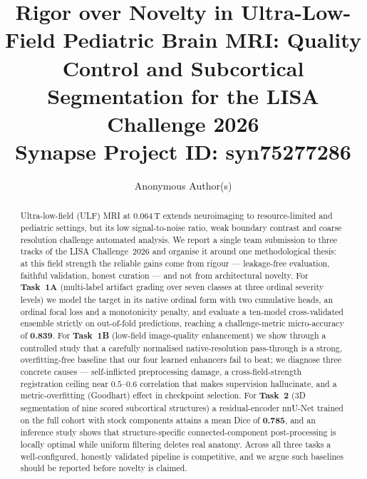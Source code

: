 \documentclass[runningheads]{llncs}
\begin{document}
\title{Rigor over Novelty in Ultra-Low-Field Pediatric Brain MRI:
Quality Control and Subcortical Segmentation for the LISA Challenge 2026\\
\large Synapse Project ID: syn75277286}

\author{Anonymous Author(s)}


\maketitle

\begin{abstract}
Ultra-low-field (ULF) MRI at 0.064\,T extends neuroimaging to resource-limited
and pediatric settings, but its low signal-to-noise ratio, weak boundary
contrast and coarse resolution challenge automated analysis. We report a single
team submission to three tracks of the LISA Challenge~2026 and organise it around
one methodological thesis: at this field strength the reliable gains come from
rigour --- leakage-free evaluation, faithful validation, honest curation --- and
not from architectural novelty. For \textbf{Task~1A} (multi-label artifact
grading over seven classes at three ordinal severity levels) we model the target
in its native ordinal form with two cumulative heads, an ordinal focal loss and a
monotonicity penalty, and evaluate a ten-model cross-validated ensemble strictly
on out-of-fold predictions, reaching a challenge-metric micro-accuracy of
\textbf{0.839}. For \textbf{Task~1B} (low-field image-quality enhancement) we
show through a controlled study that a carefully normalised native-resolution
pass-through is a strong, overfitting-free baseline that our four learned
enhancers fail to beat; we diagnose three concrete causes --- self-inflicted
preprocessing damage, a cross-field-strength registration ceiling near
$0.5$--$0.6$ correlation that makes supervision hallucinate, and a
metric-overfitting (Goodhart) effect in checkpoint selection. For
\textbf{Task~2} (3D segmentation of nine scored subcortical structures) a
residual-encoder nnU-Net trained on the full cohort with stock components attains
a mean Dice of \textbf{0.785}, and an inference study shows that
structure-specific connected-component post-processing is locally optimal while
uniform filtering deletes real anatomy. Across all three tasks a well-configured,
honestly validated pipeline is competitive, and we argue such baselines should be
reported before novelty is claimed.
\end{abstract}
\end{document}

